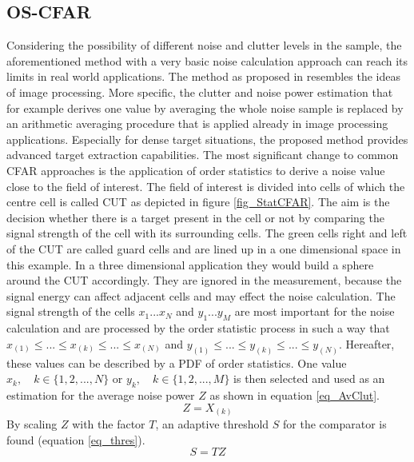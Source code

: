    \subsection{\ac{OS-CFAR}} \label{OSthre}
   Considering the possibility of different noise and clutter levels in the sample, the aforementioned method with a very basic noise calculation approach can reach its limits in real world applications. The method as proposed in \cite{AdvCFAR} resembles the ideas of image processing. More specific, the clutter and noise power estimation that for example derives one value by averaging the whole noise sample is replaced by an arithmetic averaging procedure that is applied already in image processing applications. Especially for dense target situations, the proposed method provides advanced target extraction capabilities. The most significant change to common \ac{CFAR} approaches is the application of order statistics to derive a noise value close to the field of interest. The field of interest is divided into cells of which the centre cell is called \ac{CUT} as depicted in figure \ref{fig_StatCFAR}. The aim is the decision whether there is a target present in the cell or not by comparing the signal strength of the cell with its surrounding cells. The green cells right and left of the \ac{CUT} are called guard cells and are lined up in a one dimensional space in this example. In a three dimensional application they would build a sphere around the \ac{CUT} accordingly. They are ignored in the measurement, because the signal energy can affect adjacent cells and may effect the noise calculation. The signal strength of the cells $x_1...x_N$ and $y_1...y_M$ are most important for the noise calculation and are processed by the order statistic process in such a way that $x_{(1)}\leq... \leq x_{(k)}\leq... \leq x_{(N)}$ and $y_{(1)}\leq... \leq y_{(k)}\leq... \leq y_{(N)}$. Hereafter, these values can be described by a \ac{PDF} of order statistics. One value $x_k, \quad k \in \{1,2,...,N\}$ or $y_k, \quad k \in \{1,2,...,M\}$ is then selected and used as an estimation for the average noise power $Z$ as shown in equation \ref{eq_AvClut}.
   \begin{equation}
   Z= X_{(k)}
   \label{eq_AvClut}
   \end{equation}
   By scaling $Z$ with the factor $T$, an adaptive threshold $S$ for the comparator is found (equation \ref{eq_thres}). 
   \begin{equation}
   S= TZ
   \label{eq_thres}
   \end{equation}
